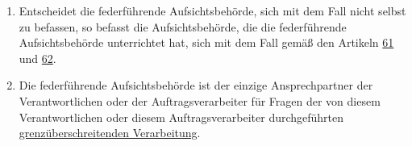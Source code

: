 \begin{enumerate}
  \item Entscheidet die federführende Aufsichtsbehörde, sich mit dem Fall nicht selbst zu befassen, so befasst die
   Aufsichtsbehörde, die die federführende Aufsichtsbehörde unterrichtet hat, sich mit dem Fall gemäß den Artikeln
   \hyperref[ch:61]{61} und \hyperref[ch:62]{62}.
  \label{itm:56-5}

  \item Die federführende Aufsichtsbehörde ist der einzige Ansprechpartner der Verantwortlichen oder der
   Auftragsverarbeiter für Fragen der von diesem Verantwortlichen oder diesem Auftragsverarbeiter durchgeführten
   \hyperref[itm:04-23]{grenzüberschreitenden Verarbeitung}.
  \label{itm:56-6}

\end{enumerate}


